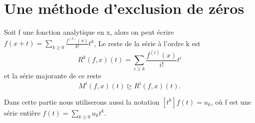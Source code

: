 \documentclass[a4paper,10.5pt]{article}
\begin{document}
		\section{Une méthode d'exclusion de zéros}
	\begin{definition} Soit f une fonction analytique en x, alors on peut écrire $f(x+t)=\sum_{k \geq 0} \frac{f^{(k)}(x)}{k!}t^{k}$, Le reste de la série à l'ordre k est 
		\[R^{k}(f,x)(t)=\sum_{i \geq k} \frac{f^{(i)}(x)}{i!}t^{i}\]
		et la série majorante de ce reste
		\[M^{i}(f,x)(t) \unrhd R^{i}(f,x)(t).\]
	\end{definition}
	Dans cette partie nous utiliserons aussi la notation $[t^k]f(t)=u_k$, où f est une série entière $f(t)=\sum_{k\geq0}u_kt^k$.
\end{document}
